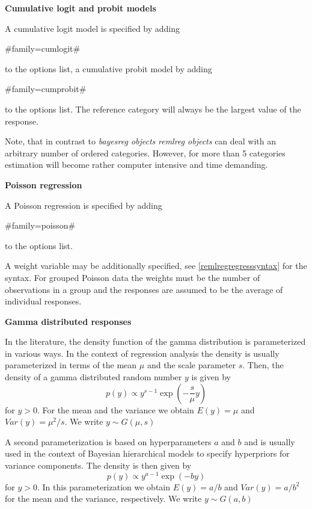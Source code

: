 {\bf Cumulative logit and probit models}

A cumulative logit model is specified by adding

#family=cumlogit#

to the options list, a cumulative probit model by adding

#family=cumprobit#

to the options list. The reference category will always be the
largest value of the response.

Note, that in contrast to {\em bayesreg objects} {\em remlreg
objects} can deal with an arbitrary number of ordered categories.
However, for more than 5 categories estimation will become rather
computer intensive and time demanding.

{\bf Poisson regression}

A Poisson regression is specified by adding

#family=poisson#

to the options list.

A weight variable may be additionally specified, see
\autoref{remlregregresssyntax} for the syntax. For grouped Poisson
data the weights must be the number of observations in a group and
the responses are assumed to be the average of individual
responses.

{\bf Gamma distributed responses}

In the literature, the density function of the gamma distribution
is parameterized in various ways. In the context of regression
analysis the density is usually parameterized in terms of the mean
$\mu$ and the scale parameter $s$. Then, the density of a gamma
distributed random number $y$ is given by
\begin{equation}
\label{remlgammapar1} p(y) \propto y^{s-1}\exp(-\frac{s}{\mu} y)
\end{equation}
for $y > 0$. For the mean and the variance we obtain $E(y) = \mu$
and $Var(y) = \mu^2/s$. We write $y \sim G(\mu,s)$

A second parameterization is based on hyperparameters $a$ and $b$
and is usually used in the context of Bayesian hierarchical models
to specify hyperpriors for variance components. The density is
then given by
\begin{equation}
\label{remlgammapar2} p(y) \propto y^{a-1}\exp(-b y)
\end{equation}
for $y>0$. In this parameterization we obtain $E(y) = a/b$ and
$Var(y) = a/b^2$ for the mean and the variance, respectively. We
write $y \sim G(a,b)$

